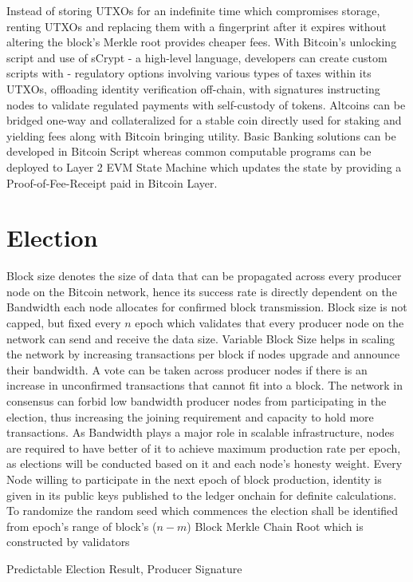 \documentclass[a4paper,10pt]{article}
\begin{document}
Instead of storing UTXOs for an indefinite time which compromises storage, renting UTXOs and replacing them with a fingerprint after it expires without altering the block's Merkle root provides cheaper fees. With Bitcoin's unlocking script and use of sCrypt - a high-level language, developers can create custom scripts with - regulatory options involving various types of taxes within its UTXOs, offloading identity verification off-chain, with signatures instructing nodes to validate regulated payments with self-custody of tokens. Altcoins can be bridged one-way and collateralized for a stable coin directly used for staking and yielding fees along with Bitcoin bringing utility. Basic Banking solutions can be developed in Bitcoin Script whereas common computable programs can be deployed to Layer 2 EVM State Machine which updates the state by providing a Proof-of-Fee-Receipt paid in Bitcoin Layer. 
\section{Election}
Block size denotes the size of data that can be propagated across every producer node on the Bitcoin network, hence its success rate is directly dependent on the Bandwidth each node allocates for confirmed block transmission. Block size is not capped, but fixed every $n$ epoch which validates that every producer node on the network can send and receive the data size. Variable Block Size helps in scaling the network by increasing transactions per block if nodes upgrade and announce their bandwidth. A vote can be taken across producer nodes if there is an increase in unconfirmed transactions that cannot fit into a block. The network in consensus can forbid low bandwidth producer nodes from participating in the election, thus increasing the joining requirement and capacity to hold more transactions. As Bandwidth plays a major role in scalable infrastructure, nodes are required to have better of it to achieve maximum production rate per epoch, as elections will be conducted based on it and each node's honesty weight. Every Node willing to participate in the next epoch of block production, identity is given in its public keys published to the ledger onchain for definite calculations. To randomize the random seed which commences the election shall be identified from epoch's range of block's ($n-m$) Block Merkle Chain Root which is constructed by validators

Predictable Election Result, Producer Signature
\end{document}

